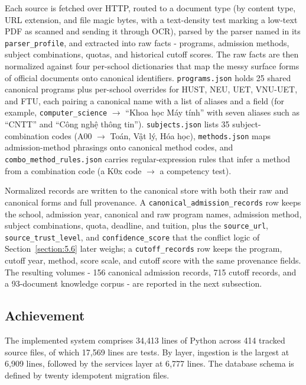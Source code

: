 \documentclass[../main.tex]{subfiles}
\begin{document}
Each source is fetched over \gls{HTTP}, routed to a document type (by content type, \gls{URL} extension, and file magic bytes, with a text-density test marking a low-text \gls{PDF} as scanned and sending it through \gls{OCR}), parsed by the parser named in its \texttt{parser\_profile}, and extracted into raw facts - programs, admission methods, subject combinations, quotas, and historical cutoff scores.
The raw facts are then normalized against four per-school dictionaries that map the messy surface forms of official documents onto canonical identifiers.
\texttt{programs.json} holds 25 shared canonical programs plus per-school overrides for HUST, NEU, UET, VNU-UET, and FTU, each pairing a canonical name with a list of aliases and a field (for example, \texttt{computer\_science} $\rightarrow$ ``Khoa học Máy tính'' with seven aliases such as ``CNTT'' and ``Công nghệ thông tin'').
\texttt{subjects.json} lists 35 subject-combination codes (A00 $\rightarrow$ Toán, Vật lý, Hóa học), \texttt{methods.json} maps admission-method phrasings onto canonical method codes, and \texttt{combo\_method\_rules.json} carries regular-expression rules that infer a method from a combination code (a K0x code $\rightarrow$ a competency test).

Normalized records are written to the canonical store with both their raw and canonical forms and full provenance.
A \texttt{canonical\_admission\_records} row keeps the school, admission year, canonical and raw program names, admission method, subject combinations, quota, deadline, and tuition, plus the \texttt{source\_url}, \texttt{source\_trust\_level}, and \texttt{confidence\_score} that the conflict logic of Section~\ref{section:5.6} later weighs; a \texttt{cutoff\_records} row keeps the program, cutoff year, method, score scale, and cutoff score with the same provenance fields.
The resulting volumes - 156 canonical admission records, 715 cutoff records, and a 93-document knowledge corpus - are reported in the next subsection.

\subsection{Achievement}

The implemented system comprises 34{,}413 lines of Python across 414 tracked source files, of which 17{,}569 lines are tests.
By layer, ingestion is the largest at 6{,}909 lines, followed by the services layer at 6{,}777 lines.
The database schema is defined by twenty idempotent migration files.
\end{document}
